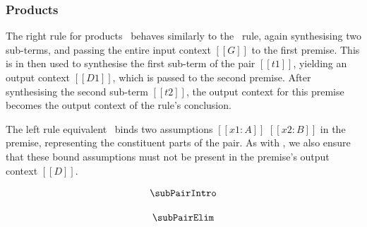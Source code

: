 \subsubsection{Products}
The right rule for products \subPairIntroName\ behaves similarly to the
\subAppName\ rule, again synthesising two sub-terms, and passing the
entire input context $[[ G ]]$ to the first premise. This is in then used to
synthesise the first sub-term of the pair $[[ t1 ]]$, yielding an output context
$ [[ D1 ]]$, which is passed to the second premise. After synthesising the
second sub-term $[[ t2 ]]$, the output context for this premise becomes the
output context of the rule's conclusion.

The left rule equivalent \subPairElimName\  binds two assumptions
$[[ x1 : A ]]$ $[[ x2 : B ]]$ in the premise, representing the constituent parts
of the pair. As with \subAppName, we also ensure that these bound assumptions must not be
 present in the premise's output context $[[ D ]]$.

\begin{align*}
\begin{array}{c}
  \subPairIntro
\\[1.25em]
  \subPairElim
\end{array}
\end{align*}
